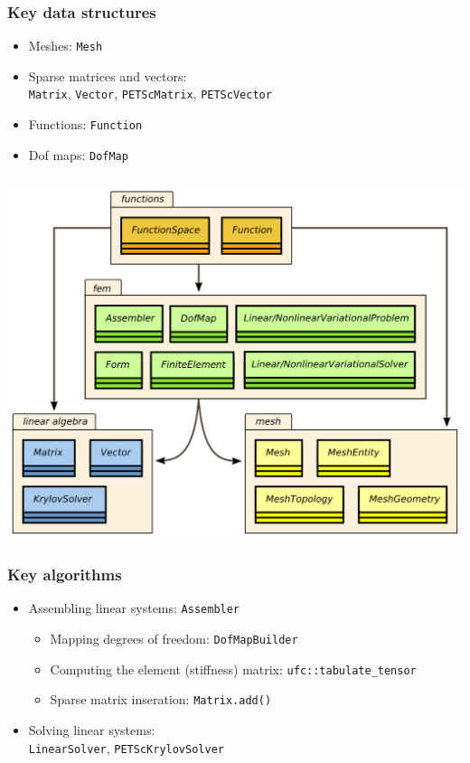 \documentclass{fenicscourse}
\begin{document}
\begin{frame}
  \frametitle{Key data structures}

  \begin{itemize}\setlength\itemsep{1em}
  \item
    Meshes:
    \texttt{Mesh}
  \item
    Sparse matrices and vectors: \\
    \texttt{Matrix}, \texttt{Vector},
    \texttt{PETScMatrix}, \texttt{PETScVector}
  \item
    Functions:
    \texttt{Function}
  \item
    Dof maps:
    \texttt{DofMap}
  \end{itemize}

\end{frame}

\begin{frame}
  \frametitle{}
  \includegraphics[width=\textwidth]{png/dolfin_classes.png}
\end{frame}

\begin{frame}
  \frametitle{Key algorithms}

  \begin{itemize}\setlength\itemsep{1em}
  \item
    Assembling linear systems: \texttt{Assembler} \\[1em]
    \begin{itemize}\setlength\itemsep{1em}
    \item
      Mapping degrees of freedom:
      \texttt{DofMapBuilder}
    \item
      Computing the element (stiffness) matrix:
      \texttt{ufc::tabulate\_tensor}
    \item
      Sparse matrix inseration:
      \texttt{Matrix.add()}
    \end{itemize}
  \item
    Solving linear systems: \\
    \texttt{LinearSolver}, \texttt{PETScKrylovSolver}
  \end{itemize}

\end{frame}
\end{document}
